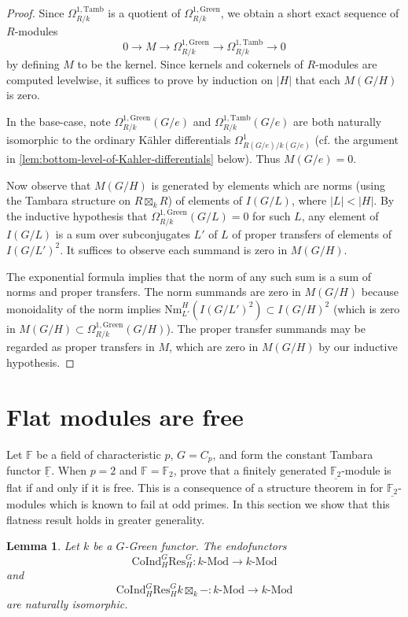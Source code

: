 \documentclass[11pt,dvipsnames]{amsart}
\newcommand{\F}{\mathbb{F}}
\newtheorem{lemma}[theorem]{Lemma}
\theoremstyle{BoldRemark}
\newcommand{\Res}{\mathrm{Res}}
\newcommand{\Coind}{\mathrm{CoInd}}
\newcommand{\Mod}{\mathrm{Mod}}
\newcommand{\Tamb}{\mathrm{Tamb}}
\newcommand{\Green}{\mathrm{Green}}
\begin{document}
\begin{proof}
    Since $\Omega^{1,\Tamb}_{R/k}$ is a quotient of $\Omega^{1,\Green}_{R/k}$, we obtain a short exact sequence of $R$-modules 
    \[ 
        0 \rightarrow M \rightarrow \Omega^{1,\Green}_{R/k} \rightarrow \Omega^{1,\Tamb}_{R/k} \rightarrow 0
    \] 
    by defining $M$ to be the kernel. Since kernels and cokernels of $R$-modules are computed levelwise, it suffices to prove by induction on $|H|$ that each $M(G/H)$ is zero.

    In the base-case, note $\Omega^{1,\Green}_{R/k}(G/e)$ and $\Omega^{1,\Tamb}_{R/k}(G/e)$ are both naturally isomorphic to the ordinary K\"{a}hler differentials $\Omega^1_{R(G/e)/k(G/e)}$ (cf. the argument in \cref{lem:bottom-level-of-Kahler-differentials} below). Thus $M(G/e) = 0$.
    
    Now observe that $M(G/H)$ is generated by elements which are norms (using the Tambara structure on $R \boxtimes_k R$) of elements of $I(G/L)$, where $|L| < |H|$. By the inductive hypothesis that $\Omega^{1,\Green}_{R/k}(G/L) = 0$ for such $L$, any element of $I(G/L)$ is a sum over subconjugates $L'$ of $L$ of proper transfers of elements of $I(G/L')^2$. It suffices to observe each summand is zero in $M(G/H)$. 
    
    The exponential formula implies that the norm of any such sum is a sum of norms and proper transfers. The norm summands are zero in $M(G/H)$ because monoidality of the norm implies $\mathrm{Nm}_{L'}^H(I(G/L')^2) \subset I(G/H)^2$ (which is zero in $M(G/H) \subset \Omega^{1,\Green}_{R/k}(G/H)$). The proper transfer summands may be regarded as proper transfers in $M$, which are zero in $M(G/H)$ by our inductive hypothesis.
\end{proof}
\section{Flat modules are free}

Let $\F$ be a field of characteristic $p$, $G = C_p$, and form the constant Tambara functor $\underline{\F}$. When $p = 2$ and $\F = \F_2$, \cite{DHM24} prove that a finitely generated $\underline{\F_2}$-module is flat if and only if it is free. This is a consequence of a structure theorem in \cite{DHM24} for $\underline{\F_2}$-modules which is known to fail at odd primes. In this section we show that this flatness result holds in greater generality.

\begin{lemma}\label{lem:coind-of-res-is-box-product}
    Let $k$ be a $G$-Green functor. The endofunctors 
    \[ 
        \Coind_H^G \Res_H^G : k \text{-} \Mod \rightarrow k \text{-} \Mod 
    \] 
    and 
    \[ 
        \Coind_H^G \Res_H^G k \boxtimes_k - : k \text{-} \Mod \rightarrow k \text{-} \Mod 
    \] 
    are naturally isomorphic.
\end{lemma}
\end{document}
